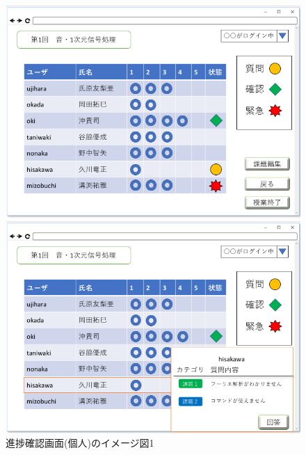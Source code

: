 

\begin{figure}[htbp]
 \begin{minipage}{0.5\hsize}
  \begin{center}
   \includegraphics[width=1\linewidth,clip]{./img/22.png}
  \end{center}
  \caption{進捗確認画面(個人)のイメージ図1}\label{fig:22}
 \end{minipage}
 \begin{minipage}{0.5\hsize}
  \begin{center}
   \includegraphics[width=1\linewidth,clip]{./img/23.png}

\end{center}
\end{minipage}
\end{figure}
